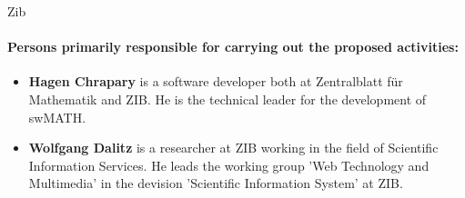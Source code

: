 \begin{sitedescription}{Zib}





\paragraph*{Persons primarily responsible for carrying out the proposed activities:}

\begin{itemize} %

\item{\bf Hagen Chrapary} is a  software developer both at Zentralblatt für Mathematik and ZIB. He is the technical leader for the development of swMATH. 
\item{\bf Wolfgang Dalitz} is a  researcher at ZIB working in the field of Scientific Information Services. 
He leads the working group 'Web Technology and Multimedia' in the devision 'Scientific Information System' at ZIB.

\end{itemize}

\end{sitedescription}

